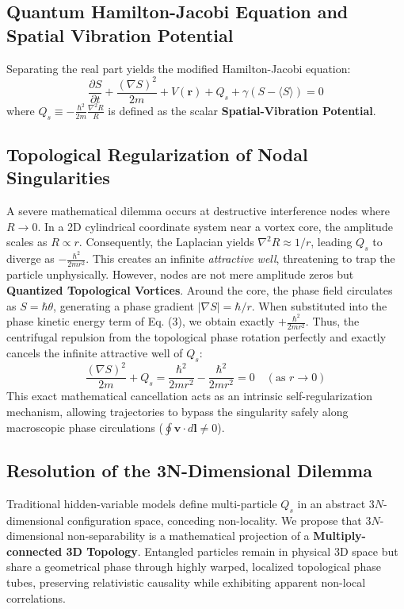 \documentclass[reprint,amsmath,amssymb,aps,prd]{revtex4-2}
\begin{document}
\subsection{Quantum Hamilton-Jacobi Equation and Spatial Vibration Potential}
Separating the real part yields the modified Hamilton-Jacobi equation:
\begin{equation}
\frac{\partial S}{\partial t} + \frac{(\nabla S)^2}{2m} + V(\mathbf{r}) + Q_s + \gamma(S - \langle S \rangle) = 0
\end{equation}
where $Q_s \equiv -\frac{\hbar^2}{2m} \frac{\nabla^2 R}{R}$ is defined as the scalar \textbf{Spatial-Vibration Potential}.
\subsection{Topological Regularization of Nodal Singularities}
A severe mathematical dilemma occurs at destructive interference nodes where $R \to 0$.
In a 2D cylindrical coordinate system near a vortex core, the amplitude scales as $R \propto r$.
Consequently, the Laplacian yields $\nabla^2 R \approx 1/r$, leading $Q_s$ to diverge as $-\frac{\hbar^2}{2m r^2}$.
This creates an infinite \textit{attractive well}, threatening to trap the particle unphysically.
However, nodes are not mere amplitude zeros but \textbf{Quantized Topological Vortices}.
Around the core, the phase field circulates as $S = \hbar \theta$, generating a phase gradient $|\nabla S| = \hbar/r$.
When substituted into the phase kinetic energy term of Eq. (3), we obtain exactly $+\frac{\hbar^2}{2m r^2}$.
Thus, the centrifugal repulsion from the topological phase rotation perfectly and exactly cancels the infinite attractive well of $Q_s$:
\begin{equation}
\frac{(\nabla S)^2}{2m} + Q_s = \frac{\hbar^2}{2m r^2} - \frac{\hbar^2}{2m r^2} = 0 \quad (\text{as } r \to 0)
\end{equation}
This exact mathematical cancellation acts as an intrinsic self-regularization mechanism, allowing trajectories to bypass the singularity safely along macroscopic phase circulations ($\oint \mathbf{v} \cdot d\mathbf{l} \neq 0$).
\subsection{Resolution of the 3N-Dimensional Dilemma}
Traditional hidden-variable models define multi-particle $Q_s$ in an abstract $3N$-dimensional configuration space, conceding non-locality.
We propose that $3N$-dimensional non-separability is a mathematical projection of a \textbf{Multiply-connected 3D Topology}.
Entangled particles remain in physical 3D space but share a geometrical phase through highly warped, localized topological phase tubes, preserving relativistic causality while exhibiting apparent non-local correlations.
\end{document}
